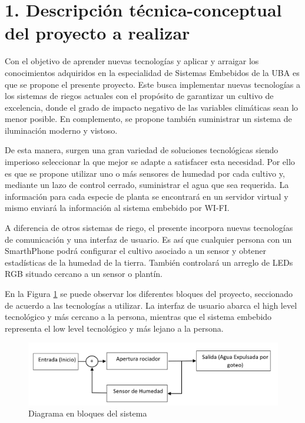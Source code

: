\documentclass[
11pt, %
]{charter}
\begin{document}
\section{1. Descripción técnica-conceptual del proyecto a realizar}
\label{sec:descripcion}

Con el objetivo de aprender nuevas tecnologías y aplicar y arraigar los conocimientos adquiridos en la especialidad de Sistemas Embebidos de la UBA es que se propone el presente proyecto. Este busca implementar nuevas tecnologías a los sistemas de riegos actuales con el propósito de garantizar un cultivo de excelencia, donde el grado de impacto negativo de las variables climáticas sean lo menor posible. En complemento, se propone también suministrar un sistema de iluminación moderno y vistoso. 

De esta manera, surgen una gran variedad de soluciones tecnológicas siendo imperioso seleccionar la que mejor se adapte a satisfacer esta necesidad. Por ello es que se propone utilizar uno o más sensores de humedad por cada cultivo y, mediante un lazo de control cerrado, suministrar el agua que sea requerida. La información para cada especie de planta se encontrará en un servidor virtual y mismo enviará la información al sistema embebido por WI-FI.

A diferencia de otros sistemas de riego, el presente incorpora nuevas tecnologías de comunicación y una interfaz de usuario. Es así que cualquier persona con un SmarthPhone podrá configurar el cultivo asociado a un sensor y obtener estadísticas de la humedad de la tierra. También controlará un arreglo de LEDs RGB situado cercano a un sensor o plantín.

En la Figura \ref{fig:diagBloques} se puede observar los diferentes bloques del proyecto, seccionado de acuerdo a las tecnologías a utilizar. La interfaz de usuario abarca el high level tecnológico y más cercano a la persona, mientras que el sistema embebido representa el low level tecnológico y más lejano a la persona.

\begin{figure}[htpb]
\centering 
\includegraphics[width=1\textwidth]{./Figuras/digBloq.png}
\caption{Diagrama en bloques del sistema}
\label{fig:diagBloques}
\end{figure}
\end{document}
